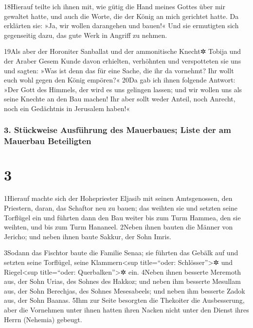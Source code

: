 18Hierauf teilte ich ihnen mit, wie gütig die Hand meines Gottes über
mir gewaltet hatte, und auch die Worte, die der König an mich gerichtet
hatte. Da erklärten sie: »Ja, wir wollen darangehen und bauen!« Und sie
ermutigten sich gegenseitig dazu, das gute Werk in Angriff zu nehmen.

19Als aber der Horoniter Sanballat und der ammonitische Knecht✲ Tobija
und der Araber Gesem Kunde davon erhielten, verhöhnten und verspotteten
sie uns und sagten: »Was ist denn das für eine Sache, die ihr da
vornehmt? Ihr wollt euch wohl gegen den König empören?« 20Da gab ich
ihnen folgende Antwort: »Der Gott des Himmels, der wird es uns gelingen
lassen; und wir wollen uns als seine Knechte an den Bau machen! Ihr aber
sollt weder Anteil, noch Anrecht, noch ein Gedächtnis in Jerusalem
haben!«

\hypertarget{stuxfcckweise-ausfuxfchrung-des-mauerbaues-liste-der-am-mauerbau-beteiligten}{%
\subsubsection{3. Stückweise Ausführung des Mauerbaues; Liste der am
Mauerbau
Beteiligten}\label{stuxfcckweise-ausfuxfchrung-des-mauerbaues-liste-der-am-mauerbau-beteiligten}}

\hypertarget{section-2}{%
\section{3}\label{section-2}}

1Hierauf machte sich der Hohepriester Eljasib mit seinen Amtsgenossen,
den Priestern, daran, das Schaftor neu zu bauen; das weihten sie und
setzten seine Torflügel ein und führten dann den Bau weiter bis zum Turm
Hammea, den sie weihten, und bis zum Turm Hananeel. 2Neben ihnen bauten
die Männer von Jericho; und neben ihnen baute Sakkur, der Sohn Imris.

3Sodann das Fischtor baute die Familie Senaa; sie führten das Gebälk auf
und setzten seine Torflügel, seine Klammern\textless sup title=``oder:
Schlösser''\textgreater✲ und Riegel\textless sup title=``oder:
Querbalken''\textgreater✲ ein. 4Neben ihnen besserte Meremoth aus, der
Sohn Urias, des Sohnes des Hakkoz; und neben ihm besserte Mesullam aus,
der Sohn Berechjas, des Sohnes Mesesabeels; und neben ihm besserte Zadok
aus, der Sohn Baanas. 5Ihm zur Seite besorgten die Thekoiter die
Ausbesserung, aber die Vornehmen unter ihnen hatten ihren Nacken nicht
unter den Dienst ihres Herrn (Nehemia) gebeugt.

